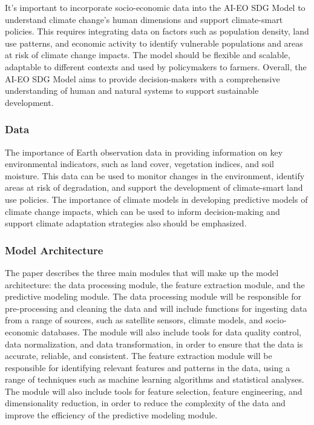 \documentclass[draft, {\secondLanguage}, english]{volcanica-template}
\begin{document}
It's important to incorporate socio-economic data into the AI-EO SDG Model to understand climate change's human dimensions and support climate-smart policies. This requires integrating data on factors such as population density, land use patterns, and economic activity to identify vulnerable populations and areas at risk of climate change impacts. The model should be flexible and scalable, adaptable to different contexts and used by policymakers to farmers. Overall, the AI-EO SDG Model aims to provide decision-makers with a comprehensive understanding of human and natural systems to support sustainable development.

\subsubsection{Data}\label{sec:02cb}
The importance of Earth observation data in providing information on key environmental indicators, such as land cover, vegetation indices, and soil moisture. This data can be used to monitor changes in the environment, identify areas at risk of degradation, and support the development of climate-smart land use policies.  The importance of climate models in developing predictive models of climate change impacts, which can be used to inform decision-making and support climate adaptation strategies also should be emphasized.

\subsubsection{Model Architecture}\label{sec:02cc}


The paper describes the three main modules that will make up the model architecture: the data processing module, the feature extraction module, and the predictive modeling module. The data processing module will be responsible for pre-processing and cleaning the data and will include functions for ingesting data from a range of sources, such as satellite sensors, climate models, and socio-economic databases. The module will also include tools for data quality control, data normalization, and data transformation, in order to ensure that the data is accurate, reliable, and consistent. The feature extraction module will be responsible for identifying relevant features and patterns in the data, using a range of techniques such as machine learning algorithms and statistical analyses. The module will also include tools for feature selection, feature engineering, and dimensionality reduction, in order to reduce the complexity of the data and improve the efficiency of the predictive modeling module.
\end{document}

